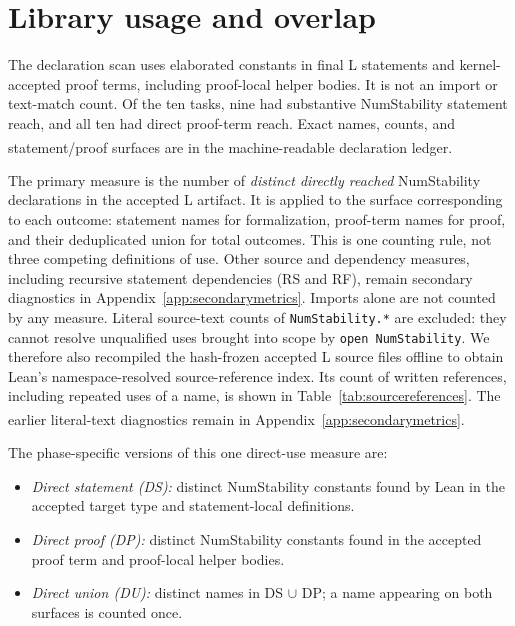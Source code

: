 \documentclass[10pt,a4paper]{article}
\newcommand{\src}[1]{\textsuperscript{\cite{#1}}}
\begin{document}
\clearpage
\section{Library usage and overlap}

The declaration scan uses elaborated constants in final L statements and
kernel-accepted proof terms, including proof-local helper bodies. It is not
an import or text-match count. Of the ten tasks, nine had
substantive NumStability statement reach, and all ten had direct proof-term
reach. Exact names, counts, and statement/proof surfaces are in the
machine-readable declaration ledger.\src{declscan,taskledger}

The primary measure is the number of \emph{distinct directly reached}
NumStability declarations in the accepted L artifact. It is applied to the
surface corresponding to each outcome: statement names for formalization,
proof-term names for proof, and their deduplicated union for total outcomes.
This is one counting rule, not three competing definitions of use. Other
source and dependency measures, including recursive statement dependencies
(RS and RF), remain secondary diagnostics in
Appendix~\ref{app:secondarymetrics}.
Imports alone are not counted by any measure. Literal source-text counts
of \texttt{NumStability.*} are excluded: they cannot resolve unqualified
uses brought into scope by \texttt{open NumStability}. We therefore also
recompiled the hash-frozen accepted L source files offline to obtain Lean's
namespace-resolved source-reference index. Its count of written references,
including repeated uses of a name, is shown in
Table~\ref{tab:sourcereferences}. The earlier literal-text diagnostics
remain in Appendix~\ref{app:secondarymetrics}.
\src{usagepoints,declscan,metriccode,sourcerefs}

The phase-specific versions of this one direct-use measure are:
\begin{itemize}\setlength{\itemsep}{1pt}
\item \emph{Direct statement (DS):} distinct NumStability constants found
  by Lean in the accepted target type and statement-local definitions.
\item \emph{Direct proof (DP):} distinct NumStability constants found in
  the accepted proof term and proof-local helper bodies.
\item \emph{Direct union (DU):} distinct names in DS $\cup$ DP; a name
  appearing on both surfaces is counted once.
\end{itemize}
\end{document}
